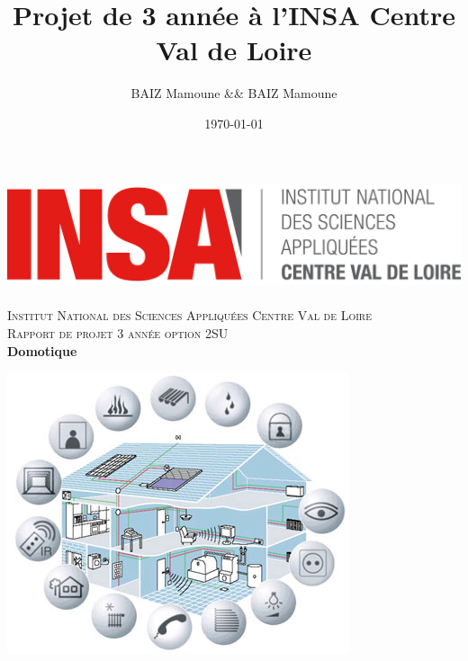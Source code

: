 



\title{ Projet de 3 année à l'INSA Centre Val de Loire } %
\author{BAIZ Mamoune && BAIZ Mamoune} %
\date{\today} %


{
\begin{titlepage}
  \begin{sffamily}
  \begin{center}

    \includegraphics[scale=0.5]{Images/png/insa_logo.png}~\\[1.5cm]

    \textsc{\LARGE Institut National des Sciences Appliquées  Centre Val de Loire }\\[2cm]

    \textsc{\Large Rapport de projet 3 année option 2SU}\\[1.5cm]

    { \huge \bfseries Domotique\\[0.4cm] }

    \includegraphics[scale=0.5]{Images/jpg/domotic.jpg}
    \\[2cm]


\end{center}
\end{sffamily}
\end{titlepage}}
